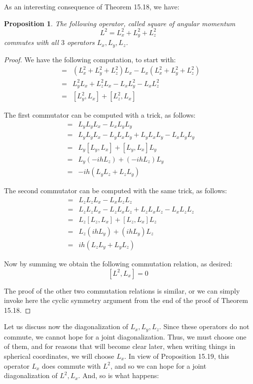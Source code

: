 \documentclass[12pt]{amsbook}
\newtheorem{proposition}[theorem]{Proposition}
\begin{document}
As an interesting consequence of Theorem 15.18, we have:

\begin{proposition}
The following operator, called square of angular momentum
$$L^2=L_x^2+L_y^2+L_z^2$$
commutes with all $3$ operators $L_x,L_y,L_z$.
\end{proposition}

\begin{proof}
We have the following computation, to start with:
\begin{eqnarray*}
[L^2,L_x]
&=&(L_x^2+L_y^2+L_z^2)L_x-L_x(L_x^2+L_y^2+L_z^2)\\
&=&L_y^2L_x+L_z^2L_x-L_xL_y^2-L_xL_z^2\\
&=&[L_y^2,L_x]+[L_z^2,L_x]
\end{eqnarray*}

The first commutator can be computed with a trick, as follows:
\begin{eqnarray*}
[L_y^2,L_x]
&=&L_yL_yL_x-L_xL_yL_y\\
&=&L_yL_yL_x-L_yL_xL_y+L_yL_xL_y-L_xL_yL_y\\
&=&L_y[L_y,L_x]+[L_y,L_x]L_y\\
&=&L_y(-ihL_z)+(-ihL_z)L_y\\
&=&-ih(L_yL_z+L_zL_y)
\end{eqnarray*}

The second commutator can be computed with the same trick, as follows:
\begin{eqnarray*}
[L_z^2,L_x]
&=&L_zL_zL_x-L_xL_zL_z\\
&=&L_zL_zL_x-L_zL_xL_z+L_zL_xL_z-L_xL_zL_z\\
&=&L_z[L_z,L_x]+[L_z,L_x]L_z\\
&=&L_z(ihL_y)+(ihL_y)L_z\\
&=&ih(L_zL_y+L_yL_z)
\end{eqnarray*}

Now by summing we obtain the following commutation relation, as desired:
$$[L^2,L_x]=0$$

The proof of the other two commutation relations is similar, or we can simply invoke here the cyclic symmetry argument from the end of the proof of Theorem 15.18.
\end{proof}

Let us discuss now the diagonalization of $L_x,L_y,L_z$. Since these operators do not commute, we cannot hope for a joint diagonalization. Thus, we must choose one of them, and for reasons that will become clear later, when writing things in spherical coordinates, we will choose $L_x$. In view of Proposition 15.19, this operator $L_x$ does commute with $L^2$, and so we can hope for a joint diagonalization of $L^2,L_x$. And, so is what happens:
\end{document}
